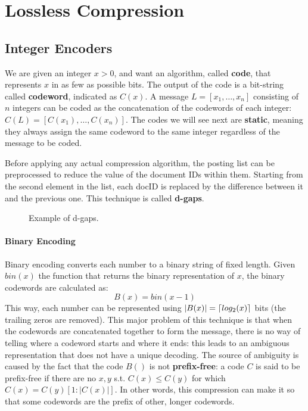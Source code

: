\section{Lossless Compression}

\subsection{Integer Encoders}

We are given an integer $x > 0$, and want an algorithm, called \textbf{code}, that represents $x$ in as few as possible bits. The output of the code is a bit-string called \textbf{codeword}, indicated as $C(x)$. A message $L = [x_1, \dots , x_n]$ consisting of $n$ integers can be coded as the concatenation of the codewords of each integer: $C(L) = [C(x_1), \dots, C(x_n)]$. The codes we will see next are \textbf{static}, meaning they always assign the same codeword to the same integer regardless of the message to be coded.

Before applying any actual compression algorithm, the posting list can be preprocessed to reduce the value of the document IDs within them. Starting from the second element in the list, each docID is replaced by the difference between it and the previous one. This technique is called \textbf{d-gaps}.
\begin{figure}[!ht]
    \centering 
     
    \caption{Example of d-gaps.}
    \label{fig:dgaps}
\end{figure}

\paragraph{Binary Encoding}
Binary encoding converts each number to a binary string of fixed length. Given $\textit{bin}(x)$ the function that returns the binary representation of $x$, the binary codewords are calculated as:
\begin{equation*}
    B(x) = \textit{bin}(x-1)
\end{equation*}
This way, each number can be represented using $|B(x)| = \left\lceil log_2(x)\right\rceil$ bits (the trailing zeros are removed). This major problem of this technique is that when the codewords are concatenated together to form the message, there is no way of telling where a codeword starts and where it ends: this leads to an ambiguous representation that does not have a unique decoding. The source of ambiguity is caused by the fact that the code $B()$ is not \textbf{prefix-free}: a code $C$ is said to be prefix-free if there are no $x, y$ s.t. $C(x) \leq C(y)$ for which $C(x) = C(y)[1 : |C(x)|]$. In other words, this compression can make it so that some codewords are the prefix of other, longer codewords.

